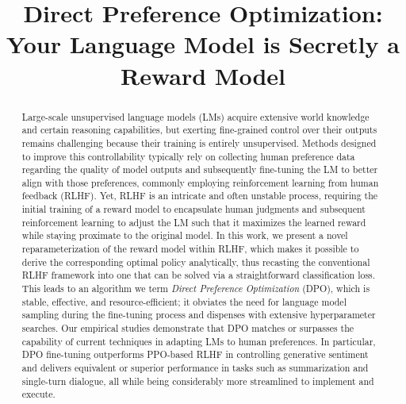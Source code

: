 \title{Direct Preference Optimization: Your Language Model is Secretly a Reward Model}

\begin{abstract}
Large-scale unsupervised language models (LMs) acquire extensive world knowledge and certain reasoning capabilities, but exerting fine-grained control over their outputs remains challenging because their training is entirely unsupervised. Methods designed to improve this controllability typically rely on collecting human preference data regarding the quality of model outputs and subsequently fine-tuning the LM to better align with those preferences, commonly employing reinforcement learning from human feedback (RLHF). Yet, RLHF is an intricate and often unstable process, requiring the initial training of a reward model to encapsulate human judgments and subsequent reinforcement learning to adjust the LM such that it maximizes the learned reward while staying proximate to the original model. In this work, we present a novel reparameterization of the reward model within RLHF, which makes it possible to derive the corresponding optimal policy analytically, thus recasting the conventional RLHF framework into one that can be solved via a straightforward classification loss. This leads to an algorithm we term \textit{Direct Preference Optimization} (DPO), which is stable, effective, and resource-efficient; it obviates the need for language model sampling during the fine-tuning process and dispenses with extensive hyperparameter searches. Our empirical studies demonstrate that DPO matches or surpasses the capability of current techniques in adapting LMs to human preferences. In particular, DPO fine-tuning outperforms PPO-based RLHF in controlling generative sentiment and delivers equivalent or superior performance in tasks such as summarization and single-turn dialogue, all while being considerably more streamlined to implement and execute.
\end{abstract}

